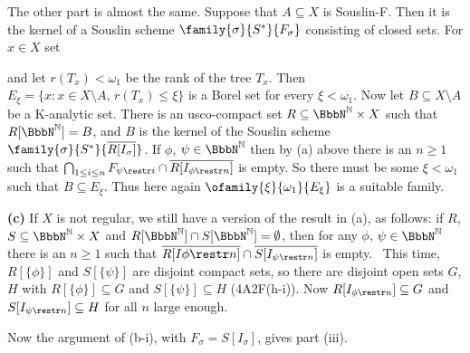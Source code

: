 {\medskip

 The other part is almost the same.
Suppose that $A\subseteq X$ is Souslin-F.   Then
it is the kernel of a Souslin scheme $\family{\sigma}{S^*}{F_{\sigma}}$
consisting of closed sets.   For $x\in X$ set


\noindent and let $r(T_x)<\omega_1$ be the rank of the tree $T_x$.
Then $E_{\xi}=\{x:x\in X\setminus A,\,r(T_x)\le\xi\}$ is a Borel set for
every $\xi<\omega_1$.   Now let $B\subseteq X\setminus A$ be a
K-analytic set.   There is an usco-compact set $R\subseteq\NN\times X$
such that $R[\NN]=B$, and $B$ is the kernel of the Souslin scheme
$\family{\sigma}{S^*}{\overline{R[I_{\sigma}]}}$.   If $\phi$,
$\psi\in\NN$ then by (a) above there is an $n\ge 1$ such that
$\bigcap_{1\le i\le n}F_{\psi\restr i}
\cap\overline{R[I_{\phi\restr n}]}$ is empty.   So there must be some
$\xi<\omega_1$ such that $B\subseteq E_{\xi}$.   Thus here again
$\ofamily{\xi}{\omega_1}{E_{\xi}}$ is a suitable family.

\medskip

{\bf (c)} If $X$ is not regular, we still have a version of the result
in (a), as follows:  if $R$, $S\subseteq\NN\times X$ and
$R[\NN]\cap S[\NN]=\emptyset$, then for any $\phi$, $\psi\in\NN$ there
is an $n\ge 1$ such that
$\overline{R[I{\phi\restr n}]}\cap\overline{S[I_{\psi\restr n}]}$ is
empty.   \Prf\ This time, $R[\{\phi\}]$ and $S[\{\psi\}]$ are disjoint
compact sets, so there are disjoint open sets $G$, $H$ with
$R[\{\phi\}]\subseteq G$ and $S[\{\psi\}]\subseteq H$ (4A2F(h-i)).  Now
$R[I_{\phi\restr n}]\subseteq G$ and $S[I_{\psi\restr n}]\subseteq H$
for all $n$ large enough.\ \Qed

Now the argument of (b-i), with $F_{\sigma}=S[I_{\sigma}]$, gives part
(iii).
}%

